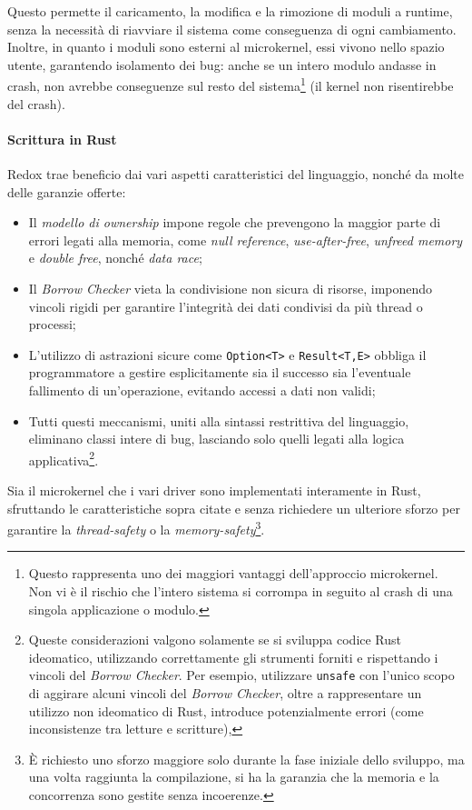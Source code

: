 Questo permette il caricamento, la modifica e la rimozione di moduli a runtime, senza la necessità di riavviare il sistema come conseguenza di ogni cambiamento.
Inoltre, in quanto i moduli sono esterni al microkernel, essi vivono nello spazio utente, garantendo isolamento dei bug: anche se un intero modulo
andasse in crash, non avrebbe conseguenze sul resto del sistema\footnote{Questo rappresenta uno dei maggiori vantaggi dell'approccio microkernel. Non vi è il rischio che l'intero sistema si corrompa in seguito al crash di una singola applicazione o modulo.} (il kernel non risentirebbe del crash).

\paragraph{Scrittura in Rust}
Redox trae beneficio dai vari aspetti caratteristici del linguaggio, nonché da molte delle garanzie offerte:
\begin{itemize}
    \item Il \textit{modello di ownership} impone regole che prevengono la maggior parte di errori legati alla memoria, come \textit{null reference}, \textit{use-after-free}, \textit{unfreed memory} e \textit{double free}, nonché \textit{data race};
    \item Il \textit{Borrow Checker} vieta la condivisione non sicura di risorse, imponendo vincoli rigidi per garantire l'integrità dei dati condivisi da più thread o processi;
    \item L'utilizzo di astrazioni sicure come \texttt{Option<T>} e \texttt{Result<T,E>} obbliga il programmatore a gestire esplicitamente sia il successo sia l'eventuale fallimento di un'operazione, evitando accessi a dati non validi;
    \item Tutti questi meccanismi, uniti alla sintassi restrittiva del linguaggio, eliminano classi intere di bug, lasciando solo quelli legati alla logica applicativa\footnote{Queste considerazioni valgono solamente se si sviluppa codice Rust ideomatico, utilizzando correttamente gli strumenti forniti e rispettando i vincoli del \textit{Borrow Checker}. Per esempio, utilizzare \texttt{unsafe} con l'unico scopo di aggirare alcuni vincoli del \textit{Borrow Checker}, oltre a rappresentare un utilizzo non ideomatico di Rust, introduce potenzialmente errori (come inconsistenze tra letture e scritture),}.
\end{itemize}
Sia il microkernel che i vari driver sono implementati interamente in Rust, sfruttando le caratteristiche sopra citate e senza 
richiedere un ulteriore sforzo per garantire la \textit{thread-safety} o la \textit{memory-safety}\footnote{È richiesto uno sforzo maggiore solo durante la fase iniziale dello sviluppo, ma una volta raggiunta la compilazione, si ha la garanzia che la memoria e la concorrenza sono gestite senza incoerenze.}.

